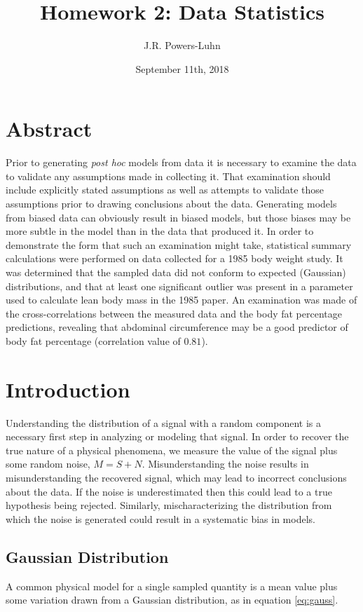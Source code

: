 \documentclass{IEEEtran}
\author{J.R. Powers-Luhn}
\title{Homework 2: Data Statistics}
\date{September 11th, 2018}
\begin{document}
\maketitle

\section{Abstract}
Prior to generating \textit{post hoc} models from data it is necessary to examine the data to validate any assumptions made in collecting it. That examination should include explicitly stated assumptions as well as attempts to validate those assumptions prior to drawing conclusions about the data. Generating models from biased data can obviously result in biased models, but those biases may be more subtle in the model than in the data that produced it. In order to demonstrate the form that such an examination might take, statistical summary calculations were performed on data collected for a 1985 body weight study. It was determined that the sampled data did not conform to expected (Gaussian) distributions, and that at least one significant outlier was present in a parameter used to calculate lean body mass in the 1985 paper. An examination was made of the cross-correlations between the measured data and the body fat percentage predictions, revealing that abdominal circumference may be a good predictor of body fat percentage (correlation value of $0.81$). 

\section{Introduction}
Understanding the distribution of a signal with a random component is a necessary first step in analyzing or modeling that signal. In order to recover the true nature of a physical phenomena, we measure the value of the signal plus some random noise, $M = S + N$. Misunderstanding the noise results in misunderstanding the recovered signal, which may lead to incorrect conclusions about the data. If the noise is underestimated then this could lead to a true hypothesis being rejected. Similarly, mischaracterizing the distribution from which the noise is generated could result in a systematic bias in models. 

\subsection{Gaussian Distribution}
A common physical model for a single sampled quantity is a mean value plus some variation drawn from a Gaussian distribution, as in equation \ref{eq:gauss}.
\end{document}

